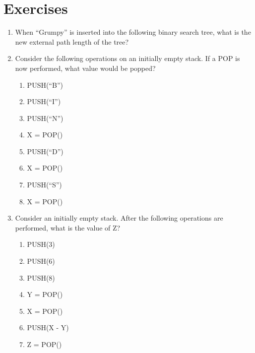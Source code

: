 \documentclass[10pt]{article}
\begin{document}
\section{Exercises}
\begin{enumerate}
\item When ``Grumpy'' is inserted into the following binary search tree, what
is the new external path length of the tree?
\begin{center}
\end{center}

\item Consider the following operations on an initially empty stack.
If a POP is now performed, what value would be popped?
\begin{multicols}{4}
\begin{enumerate}
\item PUSH(``B'')
\item PUSH(``I'')
\item PUSH(``N'')
\item X = POP()
\item PUSH(``D'')
\item X = POP()
\item PUSH(``S'')
\item X = POP()
\end{enumerate}
\end{multicols}

\item Consider an initially empty stack.
After the following operations are performed, what is the value of Z?
\begin{multicols}{3}
\begin{enumerate}
\item PUSH(3)
\item PUSH(6)
\item PUSH(8)
\item Y = POP()
\item X = POP()
\item PUSH(X - Y)
\item Z = POP()
\end{enumerate}
\end{multicols}


\end{enumerate}
\end{document}
